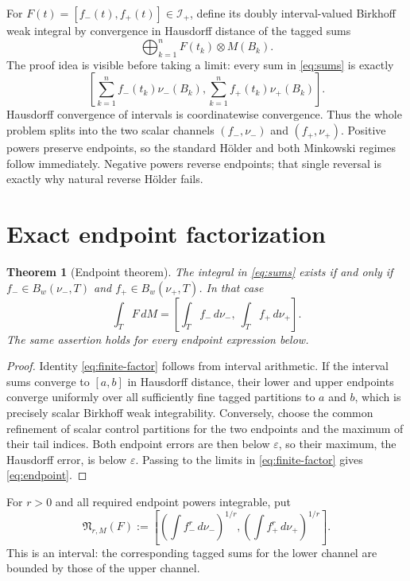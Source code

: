 \documentclass[10pt]{article}
\newtheorem{theorem}{Theorem}
\newcommand{\I}{\mathcal I_+}
\newcommand{\Bw}{B_w}
\newcommand{\N}{\mathfrak N}
\begin{document}
For $F(t)=[f_-(t),f_+(t)]\in\I$, define its doubly interval-valued Birkhoff
weak integral by convergence in Hausdorff distance of the tagged sums
\[
 \bigoplus_{k=1}^n F(t_k)\otimes M(B_k).
\tag{2}\label{eq:sums}
\]
The proof idea is visible before taking a limit: every sum in
\eqref{eq:sums} is exactly
\[
 \left[
  \sum_{k=1}^n f_-(t_k)\nu_-(B_k),
  \sum_{k=1}^n f_+(t_k)\nu_+(B_k)
 \right].
\tag{3}\label{eq:finite-factor}
\]
Hausdorff convergence of intervals is coordinatewise convergence.  Thus the
whole problem splits into the two scalar channels $(f_-,\nu_-)$ and
$(f_+,\nu_+)$.  Positive powers preserve endpoints, so the standard Hölder
and both Minkowski regimes follow immediately.  Negative powers reverse
endpoints; that single reversal is exactly why natural reverse Hölder fails.

\section{Exact endpoint factorization}

\begin{theorem}[Endpoint theorem]\label{thm:endpoint}
The integral in \eqref{eq:sums} exists if and only if
$f_-\in\Bw(\nu_-,T)$ and $f_+\in\Bw(\nu_+,T)$.  In that case
\[
 \boxed{\displaystyle
 \int_T F\,dM=
 \left[\int_T f_-\,d\nu_-,\ \int_T f_+\,d\nu_+\right].}
\tag{4}\label{eq:endpoint}
\]
The same assertion holds for every endpoint expression below.
\end{theorem}

\begin{proof}
Identity \eqref{eq:finite-factor} follows from interval arithmetic.  If the
interval sums converge to $[a,b]$ in Hausdorff distance, their lower and upper
endpoints converge uniformly over all sufficiently fine tagged partitions to
$a$ and $b$, which is precisely scalar Birkhoff weak integrability.  Conversely,
choose the common refinement of scalar control partitions for the two
endpoints and the maximum of their tail indices.  Both endpoint errors are
then below $\varepsilon$, so their maximum, the Hausdorff error, is below
$\varepsilon$.  Passing to the limits in \eqref{eq:finite-factor} gives
\eqref{eq:endpoint}.
\end{proof}

For $r>0$ and all required endpoint powers integrable, put
\[
 \N_{r,M}(F):=
 \left[
  \left(\int f_-^r\,d\nu_-\right)^{1/r},
  \left(\int f_+^r\,d\nu_+\right)^{1/r}
 \right].
\tag{5}\label{eq:gauge}
\]
This is an interval: the corresponding tagged sums for the lower channel are
bounded by those of the upper channel.
\end{document}
